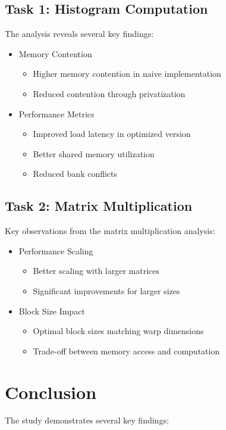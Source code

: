 \documentclass[9pt]{IEEEtran}
\begin{document}
\subsection*{Task 1: Histogram Computation}
The analysis reveals several key findings:

\begin{itemize}
    \item Memory Contention
    \begin{itemize}
        \item Higher memory contention in naive implementation
        \item Reduced contention through privatization
    \end{itemize}
    \item Performance Metrics
    \begin{itemize}
        \item Improved load latency in optimized version
        \item Better shared memory utilization
        \item Reduced bank conflicts
    \end{itemize}
\end{itemize}

\subsection*{Task 2: Matrix Multiplication}
Key observations from the matrix multiplication analysis:

\begin{itemize}
    \item Performance Scaling
    \begin{itemize}
        \item Better scaling with larger matrices
        \item Significant improvements for larger sizes
    \end{itemize}
    \item Block Size Impact
    \begin{itemize}
        \item Optimal block sizes matching warp dimensions
        \item Trade-off between memory access and computation
    \end{itemize}
\end{itemize}

\section{Conclusion}
The study demonstrates several key findings:
\end{document}
